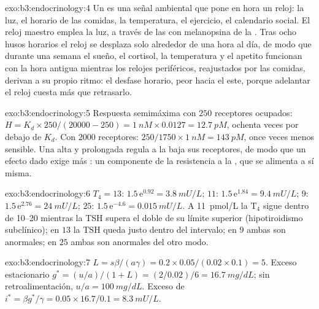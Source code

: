 \begin{solution}{exo:b3:endocrinology:4}
Un  es una señal ambiental que pone en hora un reloj: la luz,
el horario de las comidas, la temperatura, el ejercicio, el calendario
social. El reloj maestro emplea la luz, a través de las  con melanopsina de la . Tras ocho husos horarios el
reloj se desplaza solo alrededor de una hora al día, de modo que
durante una semana el sueño, el cortisol, la temperatura y el apetito
funcionan con la hora antigua mientras los relojes periféricos,
reajustados por las comidas, derivan a su propio ritmo: el desfase
horario, peor hacia el este, porque adelantar el reloj cuesta más que
retrasarlo.
\end{solution}

\begin{solution}{exo:b3:endocrinology:5}
Respuesta semimáxima con $250$ receptores ocupados: $H = K_{d}\times
250/(\num{20000} - 250) = \qty{1}{nM}\times 0.0127 = \qty{12.7}{pM}$,
ochenta veces por debajo de $K_{d}$. Con \num{2000} receptores: $250/1750
\times \qty{1}{nM} = \qty{143}{pM}$, once veces menos sensible. Una
 alta y prolongada regula a la baja sus receptores, de modo que
un efecto dado exige más : un componente de la resistencia a la
, que se alimenta a sí misma.
\end{solution}

\begin{solution}{exo:b3:endocrinology:6}
$T_{4} = 13$: $1.5\,\mathrm{e}^{0.92} = \qty{3.8}{mU/L}$; $11$:
$1.5\,\mathrm{e}^{1.84} = \qty{9.4}{mU/L}$; $9$: $1.5\,\mathrm{e}^{2.76}
= \qty{24}{mU/L}$; $25$: $1.5\,\mathrm{e}^{-4.6} = \qty{0.015}{mU/L}$. A
\qty{11}{pmol/L} la T$_{4}$ sigue dentro de \qtyrange{10}{20}{}
mientras la TSH supera el doble de su límite superior (hipotiroidismo
subclínico); en $13$ la TSH queda justo dentro del intervalo; en $9$
ambas son anormales; en $25$ ambas son anormales del otro modo.
\end{solution}

\begin{solution}{exo:b3:endocrinology:7}
$L = s\beta/(a\gamma) = 0.2\times 0.05/(0.02\times 0.1) = 5$. Exceso
estacionario $g^{*} = (u/a)/(1 + L) = (2/0.02)/6 = \qty{16.7}{mg/dL}$; sin
retroalimentación, $u/a = \qty{100}{mg/dL}$. Exceso de  $i^{*} = \beta g^{*}/
\gamma = 0.05\times 16.7/0.1 = \qty{8.3}{mU/L}$.
\end{solution}

